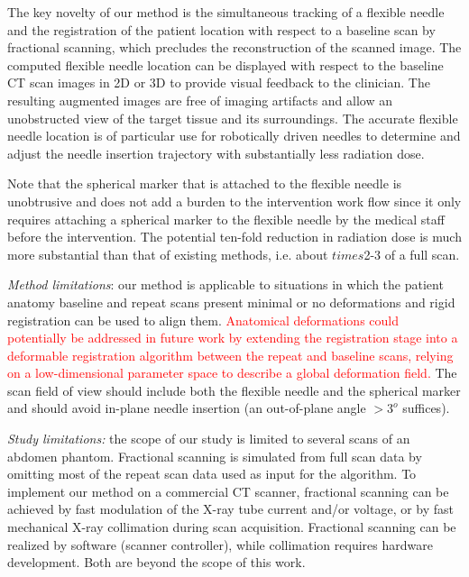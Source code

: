 The key novelty of our method is the simultaneous tracking of a flexible needle and the registration of the patient location with respect to a baseline scan by fractional scanning, which precludes the reconstruction of the scanned image.  The computed flexible needle location can be displayed with respect to the baseline CT scan images in 2D or 3D to provide visual feedback to the clinician. The resulting augmented images are free of imaging artifacts and allow an unobstructed view of the target tissue and its surroundings. The accurate flexible needle location is of particular use for robotically driven needles to determine and adjust the needle insertion trajectory with substantially less radiation dose. 

Note that the spherical marker that is attached to the flexible needle is unobtrusive and does not add a burden to the intervention work flow since it only requires attaching a spherical marker to the flexible needle by the medical staff before the intervention. The potential ten-fold reduction in radiation dose is much more substantial than that of existing methods, i.e. about $times$2-3 of a full scan. 

{\em Method limitations}: our method is applicable to situations in which the patient anatomy baseline and repeat scans present minimal or no deformations and rigid registration can be used to align them. 
\textcolor{red}{Anatomical deformations could potentially be addressed in future work by extending the registration stage into a deformable registration algorithm between the repeat and baseline scans, relying on a low-dimensional parameter space to describe a global deformation field.}
The scan field of view should include both the flexible needle and the spherical marker and should avoid in-plane needle insertion (an out-of-plane angle $>3^o$ suffices).

{\em Study limitations:} the scope of our study is limited to several scans of an abdomen phantom. Fractional scanning is simulated from full scan data by omitting most of the repeat scan data used as input for the algorithm. To implement our method on a commercial CT scanner, fractional scanning can be achieved by fast modulation of the X-ray tube current and/or voltage, or by fast mechanical X-ray  collimation during scan acquisition. Fractional scanning can be realized by software (scanner controller), while collimation requires hardware development. Both are beyond the scope of this work.
 
